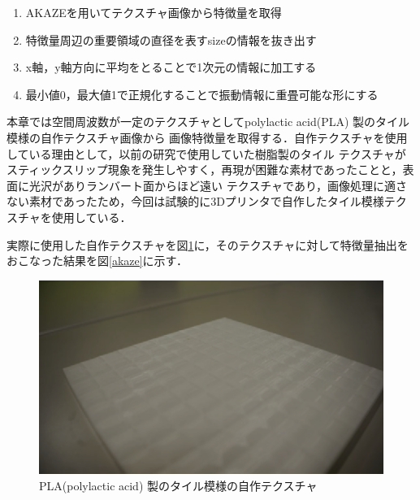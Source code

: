 \begin{enumerate}
 \item AKAZEを用いてテクスチャ画像から特徴量を取得
 \item 特徴量周辺の重要領域の直径を表すsizeの情報を抜き出す
 \item x軸，y軸方向に平均をとることで1次元の情報に加工する
 \item 最小値0，最大値1で正規化することで振動情報に重畳可能な形にする
\end{enumerate}

本章では空間周波数が一定のテクスチャとしてpolylactic acid(PLA) 製のタイル模様の自作テクスチャ画像から
画像特徴量を取得する．自作テクスチャを使用している理由として，以前の研究で使用していた樹脂製のタイル
テクスチャがスティックスリップ現象を発生しやすく，再現が困難な素材であったことと，表面に光沢がありランバート面からほど遠い
テクスチャであり，画像処理に適さない素材であったため，今回は試験的に3Dプリンタで自作したタイル模様テクスチャを使用している．

実際に使用した自作テクスチャを図\ref{tile}に，そのテクスチャに対して特徴量抽出をおこなった結果を図\ref{akaze}に示す．

\begin{figure}[ht]
\begin{center}
  \includegraphics[width=12cm]{tile.eps}
  \caption{PLA(polylactic acid) 製のタイル模様の自作テクスチャ}
  \label{tile}
\end{center}
\end{figure}

